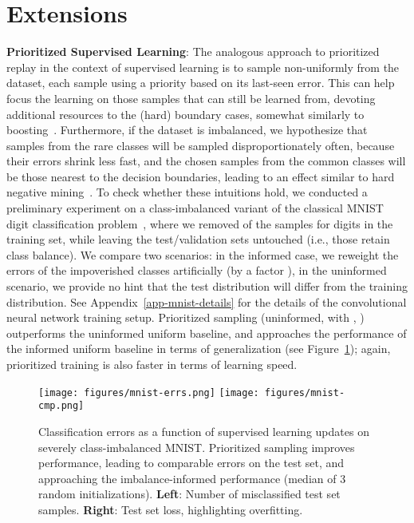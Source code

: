 \documentclass[a4paper]{article}
\begin{document}
\section{Extensions}


{\bf Prioritized Supervised Learning}:
The analogous approach to prioritized replay in the context of supervised learning 
is to sample non-uniformly from the dataset, each sample using a priority based on its last-seen error.
This can help focus the learning on those samples that
can still be learned from, devoting additional resources to the (hard) boundary cases, 
somewhat similarly to boosting~\citep{imbalance-ensemble}.
Furthermore, if the dataset is imbalanced, we hypothesize that samples from the rare classes 
will be sampled disproportionately often, because their errors shrink less fast,
and the chosen samples from the common classes will be those nearest to the decision boundaries,
leading to an effect similar to hard negative mining~\citep{hard-negative}.
To check whether these intuitions hold, we conducted a preliminary experiment 
on a class-imbalanced variant of the classical MNIST digit classification problem~\citep{mnist}, 
where we removed  of the samples for digits  in the training set,
while leaving the test/validation sets untouched (i.e., those retain class balance). 
We compare two scenarios: in the informed case, we reweight the errors of the impoverished classes artificially (by a factor ),
in the uninformed scenario, we provide no hint that the test distribution will  differ from the training distribution.
See Appendix~\ref{app-mnist-details} for the details of the convolutional neural network training setup.
Prioritized sampling (uninformed, with , ) outperforms the uninformed uniform baseline, 
and approaches the performance of the informed uniform baseline in terms of generalization (see Figure~\ref{fig-mnist});
again, prioritized training is also faster in terms of learning speed.


\begin{figure}
\vspace{-1.5em}
\centerline{
\texttt{[image: figures/mnist-errs.png]}
\texttt{[image: figures/mnist-cmp.png]}
}
\vspace{-1em}
\caption{
\label{fig-mnist}
Classification errors as a function of supervised learning updates on severely class-imbalanced MNIST. 
Prioritized sampling improves performance, leading to comparable errors on the test set,
and approaching the imbalance-informed performance (median of 3 random initializations). 
{\bf Left}: Number of misclassified test set samples. {\bf Right}: Test set loss, highlighting overfitting. 
\vspace{-1.5em}
}
\end{figure}
\end{document}
